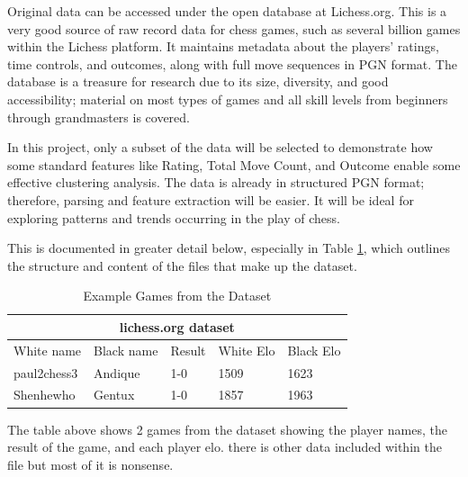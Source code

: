 \documentclass[conference]{IEEEtran}
\begin{document}
Original data can be accessed under the open database at Lichess.org. This is a very good source of raw record data for chess games, such as several billion games within the Lichess platform. It maintains metadata about the players' ratings, time controls, and outcomes, along with full move sequences in PGN format. The database is a treasure for research due to its size, diversity, and good accessibility; material on most types of games and all skill levels from beginners through grandmasters is covered.

In this project, only a subset of the data will be selected to demonstrate how some standard features like Rating, Total Move Count, and Outcome enable some effective clustering analysis. The data is already in structured PGN format; therefore, parsing and feature extraction will be easier. It will be ideal for exploring patterns and trends occurring in the play of chess.

This is documented in greater detail below, especially in Table \ref{example-games}, which outlines the structure and content of the files that make up the dataset.

\begin{table}[htbp]
\vspace{.01cm}
\caption{Example Games from the Dataset}
\begin{center}
\begin{tabular}{|lllll|}
\hline
\multicolumn{5}{|c|}{lichess.org dataset}                                                                                                      \\ \hline
\multicolumn{1}{|l|}{White name}  & \multicolumn{1}{l|}{Black name} & \multicolumn{1}{l|}{Result} & \multicolumn{1}{l|}{White Elo} & Black Elo \\ \hline
\multicolumn{1}{|l|}{paul2chess3} & \multicolumn{1}{l|}{Andique}    & \multicolumn{1}{l|}{1-0}    & \multicolumn{1}{l|}{1509}      & 1623      \\ \hline
\multicolumn{1}{|l|}{Shenhewho}   & \multicolumn{1}{l|}{Gentux}     & \multicolumn{1}{l|}{1-0}    & \multicolumn{1}{l|}{1857}      & 1963      \\ \hline
\end{tabular}
\begin{minipage}{8cm}
    \vspace{0.1cm}
    \small The table above shows 2 games from the dataset showing the player names, the result of the game, and each player elo. there is other data included within the file but most of it is nonsense.
\end{minipage}
\end{center}
\label{example-games}
\end{table}
\end{document}

